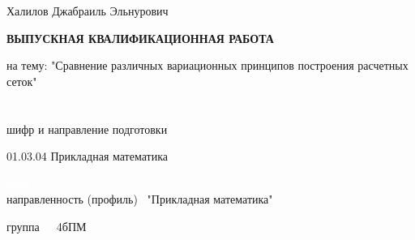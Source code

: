 \documentclass[a4paper,14pt,russian]{extreport}
\renewcommand{\_}{\kern-1.5pt\textunderscore\kern-1.5pt}
\begin{document}
	\begin{center}
		\begin{large}
			Халилов Джабраиль Эльнурович\par
		\end{large}
	\end{center}
	
	\begin{center}
		\textbf{ВЫПУСКНАЯ КВАЛИФИКАЦИОННАЯ РАБОТА}
	\end{center}\par
	
	\begin{flushleft}
		на тему: "Сравнение различных вариационных принципов построения расчетных сеток" \ \ \ \ \ \ \ \ \ \ \ \ \ \ \ \ \ \ \ \ \ \ \ \ \ \ \ \ \ \ \ \ \ \ \ \ \ \ \ \ \ \ \ \ \ \ \ \ \ \ \ \ \ \ \ \ \ \ \ \ \ \ \ \ \ \ \ \ \ \ \ \ \ \ \ \ \ \ \ \ \ \ \  
		\\
		
		шифр и направление подготовки \par
		01.03.04 Прикладная математика \ \ \ \ \ \ \ \ \ \ \ \ \par
		\setlength{\parskip}{0.0pt}
		\textcolor{white}{ффф}\\
		направленность (профиль) \  "Прикладная математика"  \par
		
		группа\ \ \  4бПМ  \par
		
	\end{flushleft}
	
\end{document}
